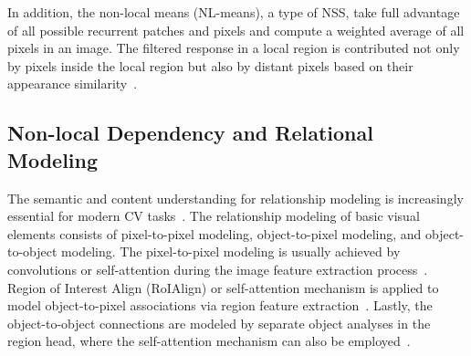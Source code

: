 	In addition, the non-local means (NL-means), a type of NSS, take full advantage of all possible recurrent patches and pixels and compute a weighted average of all pixels in an image. The filtered response in a local region is contributed not only by pixels inside the local region but also by distant pixels based on their appearance similarity~\citep{buades2011non}.
	
	\subsection{Non-local Dependency and Relational Modeling}\label{Non-local Dependency and Relational Modeling}
	The semantic and content understanding for relationship modeling is increasingly essential for modern CV tasks~\citep{hu2018relation}. The relationship modeling of basic visual elements consists of pixel-to-pixel modeling, object-to-pixel modeling, and object-to-object modeling. The pixel-to-pixel modeling is usually achieved by convolutions or self-attention during the image feature extraction process~\citep{wang2018non, yin2020disentangled, hu2019local, cao2019gcnet}. Region of Interest Align (RoIAlign) or self-attention mechanism is applied to model object-to-pixel associations via region feature extraction~\citep{gu2018learning, chi2020relationnet}. Lastly, the object-to-object connections are modeled by separate object analyses in the region head, where the self-attention mechanism can also be employed~\citep{hu2018relation}.
	
